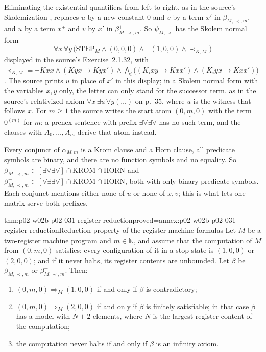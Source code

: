 Eliminating the existential quantifiers from left to right, as in the source's
Skolemization \cite[Sect.~2.1.1, Thm.~2.1.8 and Lemma~2.1.9,
pp.~25--26]{BorgerGradelGurevich1997}, replaces \(u\) by a new constant \(0\)
and \(v\) by a term \(x'\) in \(\beta_{M,\prec,m}\), and \(u\) by a term
\(x^{+}\) and \(v\) by \(x'\) in \(\beta^{+}_{M,\prec,m}\).  So
\(\psi_{M,\prec}\) has the Skolem normal form
\[
 \forall x\,\forall y\,\bigl(\mathrm{STEP}_M\land\underline{(0,0,0)}\land
 \neg\underline{(1,0,0)}\land\prec_{K,M}\bigr)
\]
displayed in the source's Exercise~2.1.32, with
\(\prec_{K,M}=\neg Kxx\land(Kyx\to Kyx')\land\bigwedge_i\bigl((K_ixy\to
Kxx')\land(K_iyx\to Kxx')\bigr)\)
\cite[Sect.~2.1.2, p.~36]{BorgerGradelGurevich1997}.  The source prints
\(u\) in place of \(x'\) in this display; in a Skolem normal form with the
variables \(x,y\) only, the letter can only stand for the successor term, as in
the source's relativized axiom \(\forall x\,\exists u\,\forall y(\ldots)\) on
p.~35, where \(u\) is the witness that follows \(x\).  For \(m\geq1\) the
source writes the start atom \(\underline{(0,m,0)}\) with the term
\(0^{(m)}\) for \(m\); a prenex sentence with prefix \(\exists\forall\exists\forall\)
has no such term, and the clauses with \(A_0,\ldots,A_m\) derive that atom
instead.

Every conjunct of \(\alpha_{M,m}\) is a Krom clause and a Horn clause, all
predicate symbols are binary, and there are no function symbols and no
equality.  So
\(\beta_{M,\prec,m}\in[\exists\forall\exists\forall]\cap\mathrm{KROM}\cap
\mathrm{HORN}\) and \(\beta^{+}_{M,\prec,m}\in[\forall\exists\exists\forall]
\cap\mathrm{KROM}\cap\mathrm{HORN}\), both with only binary predicate
symbols.  Each conjunct mentions either none of \(u\) or none of \(x,v\);
this is what lets one matrix serve both prefixes.

\begin{hbtheorem}{thm:p02-w02b-p02-031-register-reduction}{proved=annex:p02-w02b-p02-031-register-reduction}{Reduction property of the register-machine formulas}
Let \(M\) be a two-register machine program and \(m\in\mathbb N\), and assume
that the computation of \(M\) from \((0,m,0)\) satisfies: every configuration
of it in a stop state is \((1,0,0)\) or \((2,0,0)\); and if it never halts,
its register contents are unbounded.  Let \(\beta\) be
\(\beta_{M,\prec,m}\) or \(\beta^{+}_{M,\prec,m}\).  Then:
\begin{enumerate}
\item \((0,m,0)\Rightarrow_M(1,0,0)\) if and only if \(\beta\) is
      contradictory;
\item \((0,m,0)\Rightarrow_M(2,0,0)\) if and only if \(\beta\) is finitely
      satisfiable; in that case \(\beta\) has a model with \(N+2\) elements,
      where \(N\) is the largest register content of the computation;
\item the computation never halts if and only if \(\beta\) is an infinity
      axiom.
\end{enumerate}
\end{hbtheorem}


